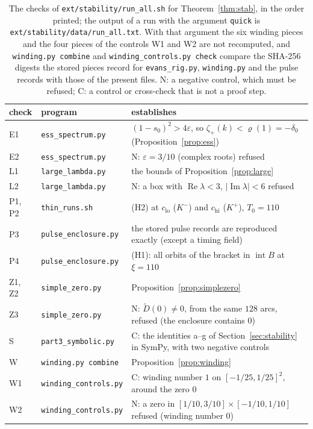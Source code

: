 \documentclass[11pt]{article}
\theoremstyle{definition}
\newcommand{\eps}{\varepsilon}
\newcommand{\re}{\operatorname{Re}}
\newcommand{\im}{\operatorname{Im}}
\newcommand{\dz}{\delta_0}
\begin{document}
\begin{table}[t]
\centering\footnotesize
\caption{The checks of \texttt{ext/stability/run\_all.sh} for Theorem~\ref{thm:stab}, in the order printed; the output of a run with the argument \texttt{quick} is \texttt{ext/stability/data/run\_all.txt}. With that argument the six winding pieces and the four pieces of the controls W1 and W2 are not recomputed, and \texttt{winding.py combine} and \texttt{winding\_controls.py check} compare the SHA-256 digests the stored pieces record for \texttt{evans\_rig.py}, \texttt{winding.py} and the pulse records with those of the present files. N: a negative control, which must be refused; C: a control or cross-check that is not a proof step.}\label{tab:stabchecks}
\begin{tabular}{llp{}}
\toprule
check & program & establishes \\
\midrule
E1 & \texttt{ess\_spectrum.py} & $(1 - s_0)^2 > 4\eps$, so $\zeta_+(k) < \varrho(1) = -\dz$ (Proposition~\ref{prop:ess}) \\
E2 & \texttt{ess\_spectrum.py} & N: $\eps = 3/10$ (complex roots) refused \\
L1 & \texttt{large\_lambda.py} & the bounds of Proposition~\ref{prop:large} \\
L2 & \texttt{large\_lambda.py} & N: a box with $\re\lambda < 3$, $|\im\lambda| < 6$ refused \\
P1, P2 & \texttt{thin\_runs.sh} & (H2) at $c_{\mathrm{lo}}$ ($K^-$) and $c_{\mathrm{hi}}$ ($K^+$), $T_0 = 110$ \\
P3 & \texttt{pulse\_enclosure.py} & the stored pulse records are reproduced exactly (except a timing field) \\
P4 & \texttt{pulse\_enclosure.py} & (H1): all orbits of the bracket in $\operatorname{int} B$ at $\xi = 110$ \\
Z1, Z2 & \texttt{simple\_zero.py} & Proposition~\ref{prop:simplezero} \\
Z3 & \texttt{simple\_zero.py} & N: $\tilde D(0) \ne 0$, from the same $128$ arcs, refused (the enclosure contains $0$) \\
S & \texttt{part3\_symbolic.py} & C: the identities a--g of Section~\ref{sec:stability} in SymPy, with two negative controls \\
W & \texttt{winding.py combine} & Proposition~\ref{prop:winding} \\
W1 & \texttt{winding\_controls.py} & C: winding number $1$ on $[-1/25, 1/25]^2$, around the zero $0$ \\
W2 & \texttt{winding\_controls.py} & N: a zero in $[1/10, 3/10] \times [-1/10, 1/10]$ refused (winding number $0$) \\
\bottomrule
\end{tabular}
\end{table}
\end{document}

